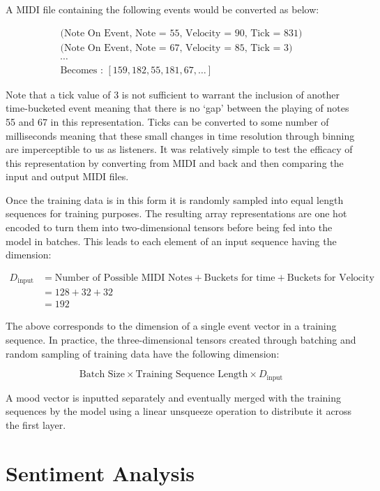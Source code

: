 \documentclass[12pt,]{article}
\begin{document}
A MIDI file containing the following events would be converted as below:

\[\begin{gathered}
\text{(Note On Event, Note = 55, Velocity = 90, Tick = 831)} \\
\text{(Note On Event, Note = 67, Velocity = 85, Tick = 3)}\\
\cdots\\
\text{Becomes : } [159, 182, 55, 181, 67, \dots]
\end{gathered}\]

Note that a tick value of 3 is not sufficient to warrant the inclusion
of another time-bucketed event meaning that there is no `gap' between
the playing of notes 55 and 67 in this representation. Ticks can be
converted to some number of milliseconds meaning that these small
changes in time resolution through binning are imperceptible to us as
listeners. It was relatively simple to test the efficacy of this
representation by converting from MIDI and back and then comparing the
input and output MIDI files.

Once the training data is in this form it is randomly sampled into equal
length sequences for training purposes. The resulting array
representations are one hot encoded to turn them into two-dimensional
tensors before being fed into the model in batches. This leads to each
element of an input sequence having the dimension:

\[\begin{aligned}
D_{\text{input}} &= \text{Number of Possible MIDI Notes} + \text{Buckets for time} + \text{Buckets for Velocity}\\
&= 128 + 32 + 32\\
&= 192
\end{aligned}\]

The above corresponds to the dimension of a single event vector in a
training sequence. In practice, the three-dimensional tensors created
through batching and random sampling of training data have the following
dimension:

\[\text{Batch Size} \times \text{Training Sequence Length} \times D_{\text{input}}\]

A mood vector is inputted separately and eventually merged with the
training sequences by the model using a linear unsqueeze operation to
distribute it across the first layer.

\hypertarget{sentiment-analysis}{%
\section{Sentiment Analysis}\label{sentiment-analysis}}
\end{document}
